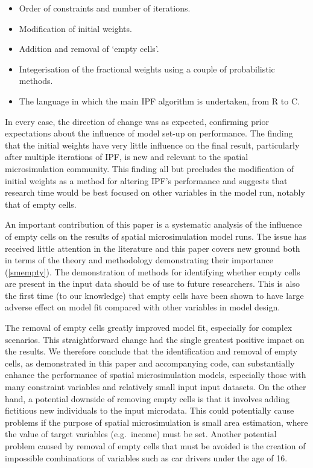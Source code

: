 \documentclass[a4paper,10pt]{article}
\begin{document}
\begin{itemize}
 \item Order of constraints and number of iterations.
 \item Modification of initial weights.
 \item Addition and removal of `empty cells'.
 \item Integerisation of the fractional weights using a couple of probabilistic methods.
 \item The language in which the main IPF algorithm is undertaken, from R to C.
\end{itemize}

In every case, the direction of change was as expected, confirming
prior expectations about the influence of model set-up on performance. The finding
that the initial weights have very little influence on the final result, particularly
after multiple iterations of IPF, is new and relevant to the spatial microsimulation
community. This finding all but precludes the modification of initial weights as
a method for altering IPF's performance and suggests that research time would be
best focused on other variables in the model run, notably that of empty cells.

An important contribution of this paper is a systematic analysis of the influence
of empty cells on the results of spatial microsimulation model runs.
The issue has received little attention in the literature and
this paper covers new ground both in terms of the theory and methodology demonstrating their importance
(\cref{smempty}). The demonstration of methods for identifying
whether empty cells are present in the input data should be of use to future researchers.
This is also the first time (to our knowledge) that empty cells have been shown to have
large adverse effect on model fit compared with other variables in model design.

The removal of empty cells greatly improved model fit,
especially for complex scenarios. This straightforward change had
the single greatest positive impact on the results.
We therefore conclude that the identification and removal of empty cells, as
demonstrated in this paper and accompanying code, can substantially enhance the performance of
spatial microsimulation models, especially those with many constraint variables and relatively
small input input datasets.
On the other hand, a potential downside of removing empty cells is that it involves adding fictitious
new individuals to the input microdata. This could potentially cause problems if the
purpose of spatial microsimulation is small area estimation, where the
value of target variables (e.g.~income) must be set.
Another potential problem caused by removal of empty cells that must be avoided is
the creation of impossible combinations of variables such as car drivers under
the age of 16.
\end{document}
